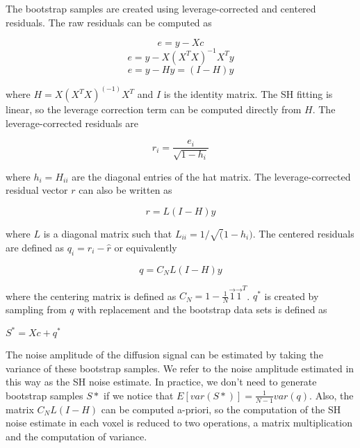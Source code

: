 The bootstrap samples are created using leverage-corrected and centered
residuals. The raw residuals can be computed as

\begin{equation}
e = y - Xc
\end{equation}
\begin{equation}
e = y - X(X^TX)^{-1}X^Ty
\end{equation}
\begin{equation}
e = y - Hy = (I - H)y
\end{equation}

where $H = X(X^TX)^(-1)X^T$ and $I$ is the identity matrix. The SH fitting is linear, so the
leverage correction term can be computed directly from $H$. The
leverage-corrected residuals are

\begin{equation}
r_i = \frac{e_i}{\sqrt{1 - h_i}}
\end{equation}

where $h_i = H_{ii}$ are the diagonal entries of the hat matrix. The leverage-corrected residual vector $r$ can also be written as

\begin{equation}
r = L(I - H)y
\end{equation}

where $L$ is a diagonal matrix such that $L_{ii} = 1 / \sqrt(1 - h_i)$. The centered residuals are defined as $q_i = r_i - \hat{r}$ or equivalently

\begin{equation}
q = C_NL(I - H)y
\end{equation}

where the centering matrix is defined as $C_N = 1 - \frac{1}{N}\vec{1}\vec{1}^T$. $q^*$ is created by sampling from $q$
with replacement and the bootstrap data sets is defined as

$S^* = Xc + q^*$

The noise amplitude of the diffusion signal can be estimated by taking
the variance of these bootstrap samples. We refer to the noise amplitude
estimated in this way as the SH noise estimate. In practice, we don't
need to generate bootstrap samples $S*$ if we notice that $E[var(S*)] = \frac{1}{N - 1}var(q)$. Also, the matrix $C_NL(I - H)$
can be computed a-priori, so the computation of the SH noise estimate in
each voxel is reduced to two operations, a matrix multiplication and the
computation of variance.

